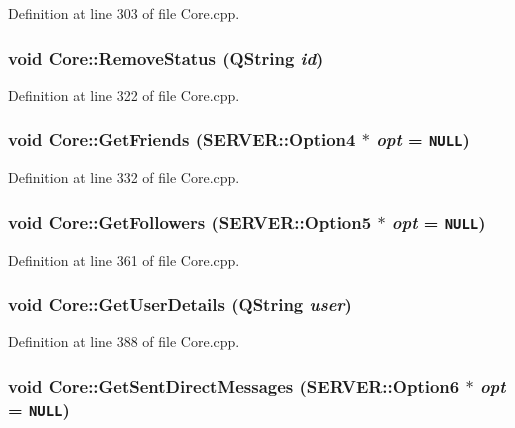 Definition at line 303 of file Core.cpp.\hypertarget{classCore_d881d4987b2845589443f74fb81da766}{
\subsubsection{\setlength{\rightskip}{0pt plus 5cm}void Core::RemoveStatus (QString {\em id})}}
\label{classCore_d881d4987b2845589443f74fb81da766}




Definition at line 322 of file Core.cpp.\hypertarget{classCore_2d41bfdcb5a2dff232ee299e83a7c8e6}{
\subsubsection{\setlength{\rightskip}{0pt plus 5cm}void Core::GetFriends ({\bf SERVER::Option4} $\ast$ {\em opt} = {\tt NULL})}}
\label{classCore_2d41bfdcb5a2dff232ee299e83a7c8e6}




Definition at line 332 of file Core.cpp.\hypertarget{classCore_635c5c7bb0b6d2c2c6250ac050b466d6}{
\subsubsection{\setlength{\rightskip}{0pt plus 5cm}void Core::GetFollowers ({\bf SERVER::Option5} $\ast$ {\em opt} = {\tt NULL})}}
\label{classCore_635c5c7bb0b6d2c2c6250ac050b466d6}




Definition at line 361 of file Core.cpp.\hypertarget{classCore_572cef51b68ea351bdda246b5070c399}{
\subsubsection{\setlength{\rightskip}{0pt plus 5cm}void Core::GetUserDetails (QString {\em user})}}
\label{classCore_572cef51b68ea351bdda246b5070c399}




Definition at line 388 of file Core.cpp.\hypertarget{classCore_1b43e65adc3ba72ae2bb344bec27eb53}{
\subsubsection{\setlength{\rightskip}{0pt plus 5cm}void Core::GetSentDirectMessages ({\bf SERVER::Option6} $\ast$ {\em opt} = {\tt NULL})}}
\label{classCore_1b43e65adc3ba72ae2bb344bec27eb53}




